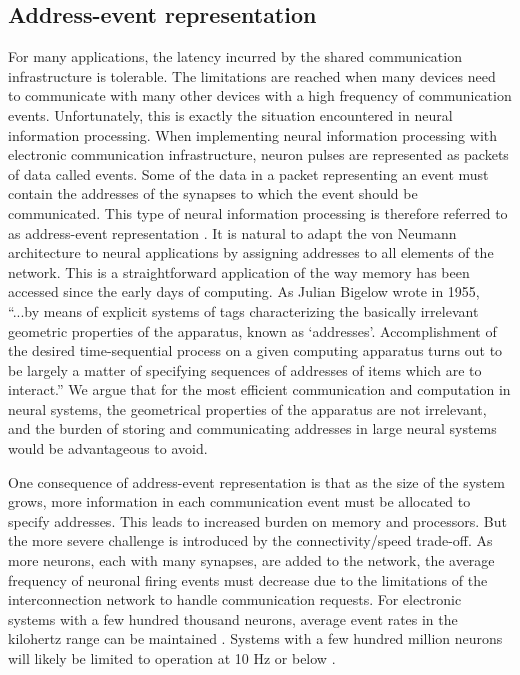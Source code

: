 \documentclass[twocolumn]{article}
\begin{document}
\subsection{Address-event representation}
For many applications, the latency incurred by the shared communication infrastructure is tolerable. The limitations are reached when many devices need to communicate with many other devices with a high frequency of communication events. Unfortunately, this is exactly the situation encountered in neural information processing. When implementing neural information processing with electronic communication infrastructure, neuron pulses are represented as packets of data called events. Some of the data in a packet representing an event must contain the addresses of the synapses to which the event should be communicated. This type of neural information processing is therefore referred to as address-event representation \cite{bo2000}. It is natural to adapt the von Neumann architecture to neural applications by assigning addresses to all elements of the network. This is a straightforward application of the way memory has been accessed since the early days of computing. As Julian Bigelow wrote in 1955, ``...by means of explicit systems of tags characterizing the basically irrelevant geometric properties of the apparatus, known as `addresses'. Accomplishment of the desired time-sequential process on a given computing apparatus turns out to be largely a matter of specifying sequences of addresses of items which are to interact.'' \cite{bi1955} We argue that for the most efficient communication and computation in neural systems, the geometrical properties of the apparatus are not irrelevant, and the burden of storing and communicating addresses in large neural systems would be advantageous to avoid.

One consequence of address-event representation is that as the size of the system grows, more information in each communication event must be allocated to specify addresses. This leads to increased burden on memory and processors. But the more severe challenge is introduced by the connectivity/speed trade-off. As more neurons, each with many synapses, are added to the network, the average frequency of neuronal firing events must decrease due to the limitations of the interconnection network to handle communication requests. For electronic systems with a few hundred thousand neurons, average event rates in the kilohertz range can be maintained \cite{}. Systems with a few hundred million neurons will likely be limited to operation at 10 Hz or below \cite{}.
\end{document}
